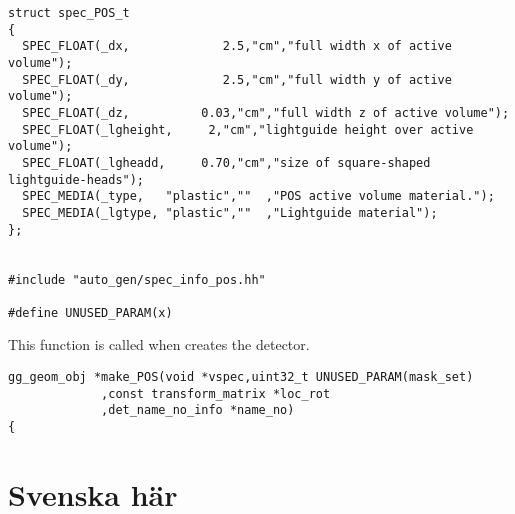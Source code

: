 \lstset{language=C++ ,basicstyle=\footnotesize, breaklines=true, %
xleftmargin=11pt, xrightmargin=11pt
}
\begin{lstlisting}
struct spec_POS_t
{
  SPEC_FLOAT(_dx,             2.5,"cm","full width x of active volume");
  SPEC_FLOAT(_dy,             2.5,"cm","full width y of active volume");
  SPEC_FLOAT(_dz,          0.03,"cm","full width z of active volume");
  SPEC_FLOAT(_lgheight,     2,"cm","lightguide height over active volume");
  SPEC_FLOAT(_lgheadd,     0.70,"cm","size of square-shaped lightguide-heads");
  SPEC_MEDIA(_type,   "plastic",""  ,"POS active volume material.");
  SPEC_MEDIA(_lgtype, "plastic",""  ,"Lightguide material");
};


#include "auto_gen/spec_info_pos.hh"

#define UNUSED_PARAM(x)
\end{lstlisting}
This function is called when  creates the detector.
\begin{lstlisting}
gg_geom_obj *make_POS(void *vspec,uint32_t UNUSED_PARAM(mask_set)
		     ,const transform_matrix *loc_rot
		     ,det_name_no_info *name_no)
{
\end{lstlisting}


\clearpage
\def\figureautorefname{figur}
\def\appendixautorefname{avsnitt}
\def\chapterautorefname{avsnitt}
\def\sectionautorefname{avsnitt}
\def\subsectionautorefname{avsnitt}
\def\subsubsectionautorefname{avsnitt}
\def\equationautorefname{ekvation}
\renewcommand{\abbrev}[2]{#1\footnote{#2}}
\chapter{Svenska här}


